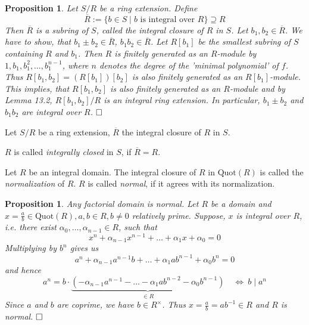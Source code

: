 \documentclass[11pt]{book}
\newtheorem{proposition}[theorem]{Proposition}
\theoremstyle{nonumberbreak}
\newenvironment{defin}[1][]{\ifthenelse{\equal{#1}{}}{\definition}{\definition[#1]}\rm}{\enddefinition}
\newenvironment{pr}[1][]{\ifthenelse{\equal{#1}{}}{\proof}{\proof[#1]}\rm}{\endproof}
\begin{document}
\begin{spacing}{1.3}
\begin{proposition} %
Let $S/R$ be a ring extension. Define
$$\overline{R}:=\{b \in S \mid b \textrm{ is integral over }R\} \supseteq R$$
Then $\overline{R}$ is a subring of $S$, called the \textit{integral closure} of $R$ in $S$.
\begin{pr}
Let $b_1, b_2 \in \overline{R}$. We have to show, that $b_1 \pm b_2 \in \overline{R}$, $b_1b_2 \in \overline{R}$.
Let $R[b_1]$ be the smallest subring of $S$ containing $R$ and $b_1$. Then $R$ is finitely generated as an $R$-module by $1,b_1, b_1^2, \ldots, b_1^{n-1}$, where $n$ denotes the degree of the 'minimal polynomial' of $f$.
Thus  $R[b_1, b_2]=\left(R[b_1]\right)[b_2]$ is also finitely generated as an $R[b_1]$-module. This implies, that $R[b_1,b_2]$ is also finitely generated as an $R$-module and by Lemma 13.2, $R[b_1,b_2]/R$ is an integral ring extension. In particular, $b_1 \pm b_2$ and $b_1b_2$ are integral over $R$. $\hfill \Box$
\end{pr}
\end{proposition}

\begin{defin} %
Let $S/R$ be a ring extension, $\overline{R}$ the integral closure of $R$ in $S$.
\begin{compactenum}
\item $R$ is called \textit{integrally closed} in $S$, if $\overline{R}=R$.
\item Let $R$ be an integral domain. The integral closure of $R$ in $\textrm{Quot}(R)$ is called the \textit{normalization} of $R$. $R$ is called \textit{normal}, if it agrees with its normalization.
\end{compactenum}
\end{defin}

\begin{proposition} %
Any factorial domain is normal.
\begin{pr}
Let $R$ be a domain and $x=\frac{a}{b} \in \textrm{Quot}(R), a,b \in R, b \neq 0$ relatively prime.
Suppose, $x$ is integral over $R$, i.e. there exist $\alpha_0, \ldots, \alpha_{n-1} \in R$, such that 
$$x^n+ \alpha_{n-1}x^{n-1}+ \ldots + \alpha_1 x+\alpha_0=0$$
Multiplying by $b^n$ gives us
$$a^n+\alpha_{n-1}a^{n-1}b + \ldots + \alpha_1 a b^{n-1}+ \alpha_0 b^n =0$$
and hence
$$a^n= b \cdot \underbrace{\left(-\alpha_{n-1}a^{n-1}- \ldots - \alpha_1 a b^{n-2} - \alpha_0 b^{n-1}\right)}_{\in R} \quad \Longleftrightarrow\ b \mid a^n$$
Since $a$ and $b$ are coprime, we have $b \in R^{\times}$. Thus $x = \frac{a}{b}=ab^{-1} \in R$ and $R$ is normal. $\hfill \Box$
\end{pr}
\end{proposition}


\end{spacing}
\end{document}
